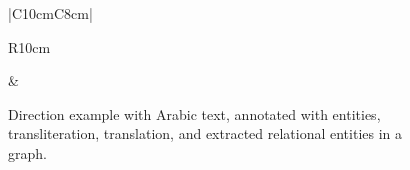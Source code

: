 \begin{figure}[tb]
\begin{center}
{\begin{tabular}{|C{10cm}C{8cm}|}
\begin{tabular}{R{10cm}}
  \end{tabular}
&
\resizebox{0.6\columnwidth}{!}{
  }
\\  \hline
    \end{tabular}
}
\end{center}
\vspace{-1em} 
  \caption{Direction example with Arabic text, annotated with entities, transliteration, translation, and extracted relational entities in a graph.} 
  \label{fig:intromotiv}
\vspace{-1em} 
\end{figure}
\transtrue
{}
